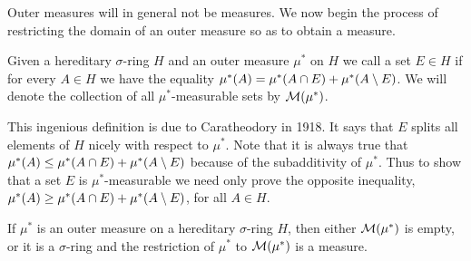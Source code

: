 Outer measures will in general not be measures. We now begin the process of restricting the domain of an outer measure so as to obtain a measure.

\begin{definition}
Given a hereditary $\sigma$-ring $H$ and an outer measure $\mu^*$ on $H$ we call a set $E\in H$  if for every $A\in H$ we have the equality $\mu^*(A)=\mu^*(A\cap E)+\mu^*(A\setminus E)$. We will denote the collection of all $\mu^*$-measurable sets by ${\cal M}(\mu^*)$.
\end{definition}

This ingenious definition is due to Caratheodory in 1918. It says that $E$ splits all elements of $H$ nicely with respect to $\mu^*$. Note that it is always true that $\mu^*(A)\leq\mu^*(A\cap E)+\mu^*(A\setminus E)$ because of the subadditivity of $\mu^*$. Thus to show that a set $E$ is $\mu^*$-measurable we need only prove the opposite inequality, $\mu^*(A)\geq\mu^*(A\cap E)+\mu^*(A\setminus E)$, for all $A\in H$.

\begin{theorem}\label{thm:restriction of outer measure to meas sets}
If $\mu^*$ is an outer measure on a hereditary $\sigma$-ring $H$, then either ${\cal M}(\mu^*)$ is empty, or it is a $\sigma$-ring and the restriction of $\mu^*$ to ${\cal M}(\mu^*)$ is a measure.
\end{theorem}

